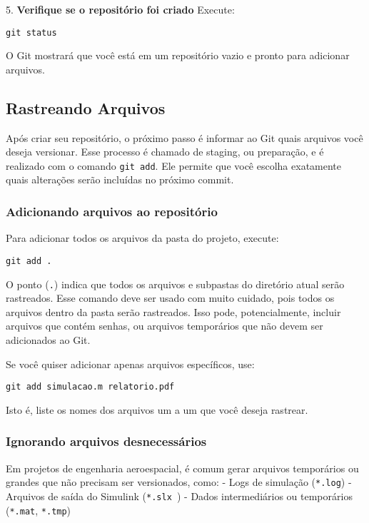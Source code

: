 5. \textbf{Verifique se o repositório foi criado}  
   Execute:
\begin{lstlisting}[style=shellstyle]
git status
\end{lstlisting}
O Git mostrará que você está em um repositório vazio e pronto para adicionar arquivos.


\subsection{Rastreando Arquivos}

Após criar seu repositório, o próximo passo é informar ao Git quais arquivos você deseja versionar. Esse processo é chamado de staging, ou preparação, e é realizado com o comando \texttt{git add}. Ele permite que você escolha exatamente quais alterações serão incluídas no próximo commit.

\subsubsection*{Adicionando arquivos ao repositório}

Para adicionar todos os arquivos da pasta do projeto, execute:

\begin{lstlisting}[style=shellstyle]
git add .
\end{lstlisting}

\noindent
O ponto (\texttt{.}) indica que todos os arquivos e subpastas do diretório atual serão rastreados. Esse comando deve ser usado com muito cuidado, pois todos os arquivos dentro da pasta serão rastreados. Isso pode, potencialmente, incluir arquivos que contém senhas, ou arquivos temporários que não devem ser adicionados ao Git. 

Se você quiser adicionar apenas arquivos específicos, use:

\begin{lstlisting}[style=shellstyle]
git add simulacao.m relatorio.pdf
\end{lstlisting}

Isto é, liste os nomes dos arquivos um a um que você deseja rastrear.

\subsubsection*{Ignorando arquivos desnecessários}

Em projetos de engenharia aeroespacial, é comum gerar arquivos temporários ou grandes que não precisam ser versionados, como:  
- Logs de simulação (\texttt{*.log})  
- Arquivos de saída do Simulink (\texttt{*.slx~})  
- Dados intermediários ou temporários (\texttt{*.mat}, \texttt{*.tmp})


